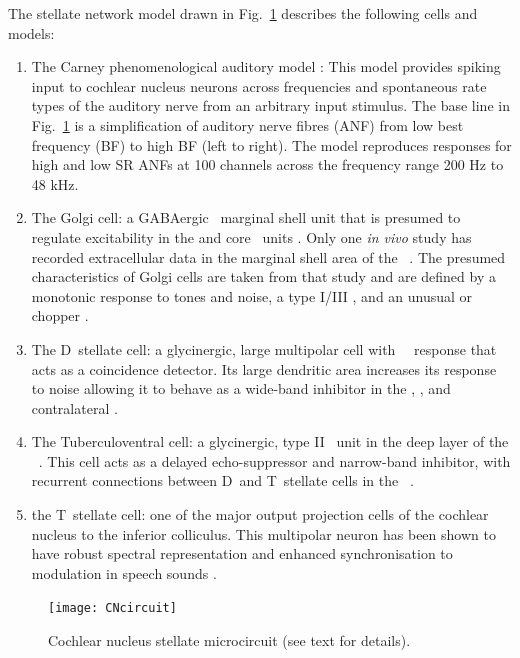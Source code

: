   The stellate
network model drawn in Fig.~\ref{fig:microcircuit} describes the following cells
and models:
\begin{enumerate}
\item The Carney phenomenological auditory model \citet{ZilanyBruceEtAl:2009}:
  This model provides spiking input to cochlear nucleus neurons across
  frequencies and spontaneous rate types of the auditory nerve from an arbitrary
  input stimulus. The base line in Fig.~\ref{fig:microcircuit} is a
  simplification of auditory nerve fibres (ANF) from low best frequency (BF) to
  high BF (left to right). The model reproduces responses for high and low SR
  ANFs at 100 channels across the frequency range 200 Hz to 48 kHz.
\item The Golgi cell: a {GABA}ergic \VCN~marginal shell unit that is presumed to
  regulate excitability in the \GCD and core \VCN~units
  \citep{FerragamoGoldingEtAl:1998}. Only one \textit{in vivo} study has
  recorded extracellular data in the marginal shell area of the
  \CN~\citep{GhoshalKim:1997}. The presumed characteristics of Golgi cells are
  taken from that study and are defined by a monotonic response to tones and
  noise, a type I/III \EIRA, and an unusual or chopper {\PSTH}.
\item The D~stellate cell: a glycinergic, large multipolar cell with
  \OnC~\PSTH~response that acts as a coincidence detector. Its large
  dendritic area increases its response to noise allowing it to behave as a
  wide-band inhibitor in the \VCN, \DCN, and contralateral \CN
  \citep{SmithMassieEtAl:2005,ArnottWallaceEtAl:2004,NeedhamPaolini:2007}.
\item The Tuberculoventral cell: a glycinergic, type II {\EIRA}~unit in the deep
  layer of the \DCN~\citep{SpirouDavisEtAl:1999}.  This cell acts as a delayed
  echo-suppressor and narrow-band inhibitor, with recurrent connections between
  D~and T~stellate cells in the \VCN~\citep{Alibardi:2006,OertelWickesberg:1993,WickesbergWhitlonEtAl:1991}.
\item the T~stellate cell: one of the major output projection cells of the
  cochlear nucleus to the inferior colliculus. This multipolar neuron has been
  shown to have robust spectral representation and enhanced synchronisation to
  modulation in speech sounds
  \citep{BlackburnSachs:1990,KeilsonRichardsEtAl:1997}.
\end{enumerate}

\begin{figure}[htb]
  \centering
  \texttt{[image: CNcircuit]}
  \caption[Cochlear nucleus stellate microcircuit]{Cochlear nucleus stellate microcircuit (see text for details). }
  \label{fig:microcircuit}
\end{figure}

